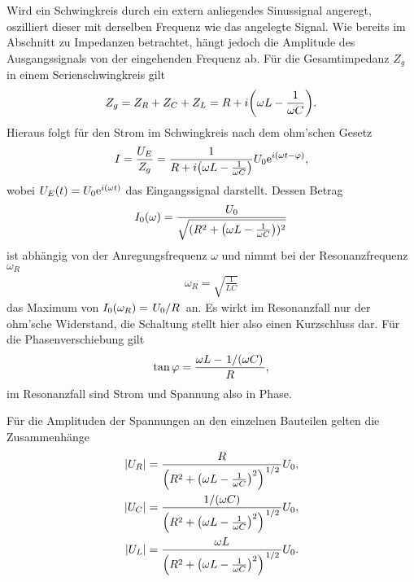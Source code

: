 Wird ein Schwingkreis durch ein extern anliegendes Sinussignal angeregt, oszilliert dieser mit derselben Frequenz wie das angelegte Signal. Wie bereits im Abschnitt zu Impedanzen betrachtet, hängt jedoch die Amplitude des Ausgangssignals von der eingehenden Frequenz ab. Für die Gesamtimpedanz $Z_g$ in einem Serienschwingkreis gilt
\begin{align}
  Z_g = Z_R + Z_C + Z_L = R + i\qty(\omega L - \frac{1}{\omega C}).
\end{align}
Hieraus folgt für den Strom im Schwingkreis nach dem ohm'schen Gesetz
\begin{align}
  I = \frac{U_E}{Z_g} = \frac{1}{R + i\qty(\omega L - \frac{1}{\omega C})} U_0 \text{e}^{i(\omega t - \varphi)},
\end{align}
wobei $U_E(t) = U_0 \text{e}^{i(\omega t)}$ das Eingangssignal darstellt. Dessen Betrag
\begin{align}
  I_0(\omega) = \frac{U_0}{\sqrt{(R^2 + \qty(\omega L - \frac{1}{\omega C}))^2}}
\end{align}
ist abhängig von der Anregungsfrequenz $\omega$ und nimmt bei der Resonanzfrequenz $\omega_R$
\begin{align}
  \omega_R = \sqrt{\frac{1}{LC}}
\end{align}
das Maximum von $I_0(\omega_R) = \ffrac{U_0}{R}$ an. Es wirkt im Resonanzfall nur der ohm'sche Widerstand, die Schaltung stellt hier also einen Kurzschluss dar. Für die Phasenverschiebung gilt
\begin{align}
  \tan \varphi = \frac{\omega L - \ffrac{1}{(\omega C)}}{R},
\end{align}
im Resonanzfall sind Strom und Spannung also in Phase.

Für die Amplituden der Spannungen an den einzelnen Bauteilen gelten die Zusammenhänge
\begin{align}
\qty| U_R | = \frac{R}{\qty( R^2 + \qty( \omega L - \frac{1}{\omega C} )^2 )^{\ffrac{1}{2}}} U_0,\\
\qty| U_C | = \frac{1/(\omega C)}{\qty( R^2 + \qty( \omega L - \frac{1}{\omega C} )^2 )^{\ffrac{1}{2}}} U_0,\\
\qty| U_L | = \frac{\omega L}{\qty( R^2 + \qty( \omega L - \frac{1}{\omega C} )^2 )^{\ffrac{1}{2}}} U_0.\\
\end{align}

